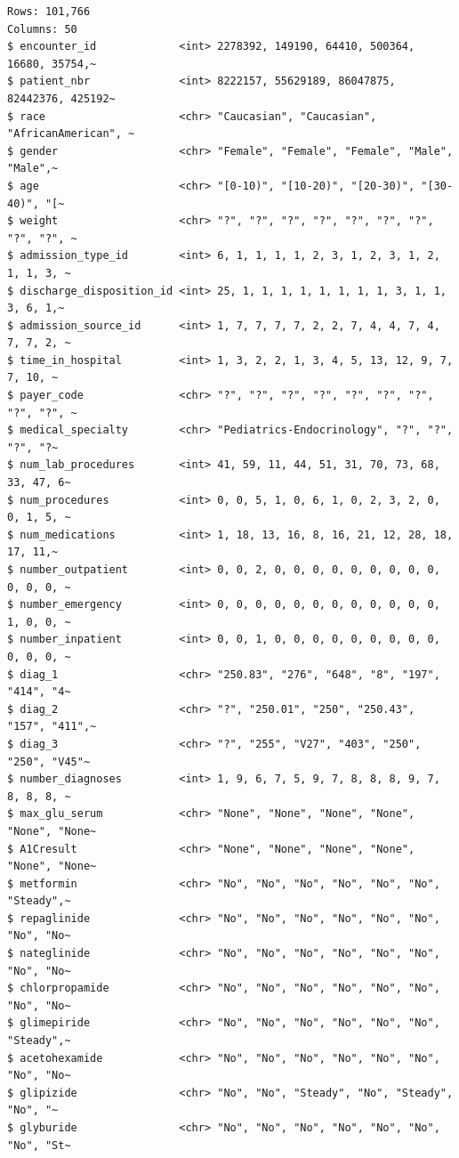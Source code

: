 \documentclass[
  letterpaper,
  DIV=11,
  numbers=noendperiod]{scrreprt}
\theoremstyle{definition}
\theoremstyle{remark}
\begin{document}
\begin{verbatim}
Rows: 101,766
Columns: 50
$ encounter_id             <int> 2278392, 149190, 64410, 500364, 16680, 35754,~
$ patient_nbr              <int> 8222157, 55629189, 86047875, 82442376, 425192~
$ race                     <chr> "Caucasian", "Caucasian", "AfricanAmerican", ~
$ gender                   <chr> "Female", "Female", "Female", "Male", "Male",~
$ age                      <chr> "[0-10)", "[10-20)", "[20-30)", "[30-40)", "[~
$ weight                   <chr> "?", "?", "?", "?", "?", "?", "?", "?", "?", ~
$ admission_type_id        <int> 6, 1, 1, 1, 1, 2, 3, 1, 2, 3, 1, 2, 1, 1, 3, ~
$ discharge_disposition_id <int> 25, 1, 1, 1, 1, 1, 1, 1, 1, 3, 1, 1, 3, 6, 1,~
$ admission_source_id      <int> 1, 7, 7, 7, 7, 2, 2, 7, 4, 4, 7, 4, 7, 7, 2, ~
$ time_in_hospital         <int> 1, 3, 2, 2, 1, 3, 4, 5, 13, 12, 9, 7, 7, 10, ~
$ payer_code               <chr> "?", "?", "?", "?", "?", "?", "?", "?", "?", ~
$ medical_specialty        <chr> "Pediatrics-Endocrinology", "?", "?", "?", "?~
$ num_lab_procedures       <int> 41, 59, 11, 44, 51, 31, 70, 73, 68, 33, 47, 6~
$ num_procedures           <int> 0, 0, 5, 1, 0, 6, 1, 0, 2, 3, 2, 0, 0, 1, 5, ~
$ num_medications          <int> 1, 18, 13, 16, 8, 16, 21, 12, 28, 18, 17, 11,~
$ number_outpatient        <int> 0, 0, 2, 0, 0, 0, 0, 0, 0, 0, 0, 0, 0, 0, 0, ~
$ number_emergency         <int> 0, 0, 0, 0, 0, 0, 0, 0, 0, 0, 0, 0, 1, 0, 0, ~
$ number_inpatient         <int> 0, 0, 1, 0, 0, 0, 0, 0, 0, 0, 0, 0, 0, 0, 0, ~
$ diag_1                   <chr> "250.83", "276", "648", "8", "197", "414", "4~
$ diag_2                   <chr> "?", "250.01", "250", "250.43", "157", "411",~
$ diag_3                   <chr> "?", "255", "V27", "403", "250", "250", "V45"~
$ number_diagnoses         <int> 1, 9, 6, 7, 5, 9, 7, 8, 8, 8, 9, 7, 8, 8, 8, ~
$ max_glu_serum            <chr> "None", "None", "None", "None", "None", "None~
$ A1Cresult                <chr> "None", "None", "None", "None", "None", "None~
$ metformin                <chr> "No", "No", "No", "No", "No", "No", "Steady",~
$ repaglinide              <chr> "No", "No", "No", "No", "No", "No", "No", "No~
$ nateglinide              <chr> "No", "No", "No", "No", "No", "No", "No", "No~
$ chlorpropamide           <chr> "No", "No", "No", "No", "No", "No", "No", "No~
$ glimepiride              <chr> "No", "No", "No", "No", "No", "No", "Steady",~
$ acetohexamide            <chr> "No", "No", "No", "No", "No", "No", "No", "No~
$ glipizide                <chr> "No", "No", "Steady", "No", "Steady", "No", "~
$ glyburide                <chr> "No", "No", "No", "No", "No", "No", "No", "St~

\end{verbatim}
\end{document}
